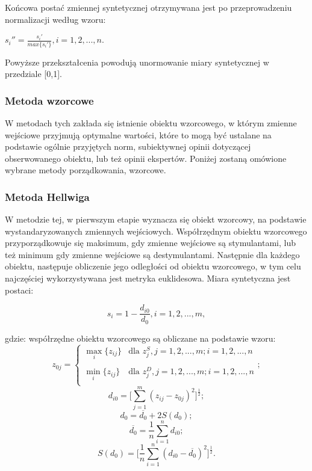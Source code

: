 \documentclass[12pt,a4paper]{report}
\begin{document}
Końcowa postać zmiennej syntetycznej otrzymywana jest po przeprowadzeniu normalizacji według wzoru:
\begin{center}
$s_{i}''=\frac{s_{i}'}{max\{s_{i}'\}}, i=1, 2, ..., n$.\\
\end{center}
Powyższe przekształcenia powodują unormowanie miary syntetycznej w przedziale [0,1].
\newpage

\subsubsection{Metoda wzorcowe}
\noindent

W metodach tych zakłada się istnienie obiektu wzorcowego, w którym zmienne wejściowe przyjmują optymalne wartości, które to mogą być ustalane na podstawie ogólnie przyjętych norm, subiektywnej opinii dotyczącej obserwowanego obiektu, lub też opinii ekspertów. Poniżej zostaną omówione wybrane metody porządkowania, wzorcowe.

\subsubsection{Metoda Hellwiga}
\noindent

W metodzie tej, w pierwszym etapie wyznacza się obiekt wzorcowy, na podstawie wystandaryzowanych zmiennych wejściowych. Współrzędnym obiektu wzorcowego przyporządkowuje się maksimum, gdy zmienne wejściowe są stymulantami, lub też minimum gdy zmienne wejściowe są destymulantami. Następnie dla każdego obiektu, następuje obliczenie jego odległości od obiektu wzorcowego, w tym celu najczęściej wykorzystywana jest metryka euklidesowa. 
Miara syntetyczna jest postaci: 
\begin{center}
$$s_i=1-\frac{d_{i0}}{d_{0}}, i=1, 2, ..., m ,$$
\end{center}
gdzie:
\newline
współrzędne obiektu wzorcowego są obliczane na podstawie wzoru:
$$z_{0j}=\left\{ \begin{array}{ll}
\max\limits_{i} \{z_{ij}\} & \textrm{dla  } z_{j}^S, j=1,2,...,m; i=1,2,...,n\\\\
\min\limits_{i} \{z_{ij}\} & \textrm{dla } z_{j}^D, j=1,2,...,m; i=1,2,...,n\\
\end{array} \right.; $$
$$d_{i0}=\bigg[\sum_{j=1}^{m} (z_{ij} - z_{0j})^2 \bigg]^\frac{1}{2} ;$$ 
$$d_{0}=\overline{d_{0}} + 2S(d_{0}) ;$$
$$\overline{d_{0}}=\frac{1}{n}\sum_{i=1}^{n} d_{i0} ;$$
$$S(d_{0})=\bigg[\frac{1}{n}\sum_{i=1}^{n} (d_{i0}-\overline{d_{0}})^2 \bigg]^\frac{1}{2} .$$
\end{document}
